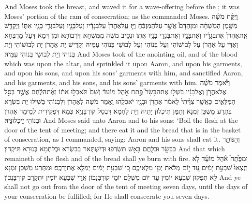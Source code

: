 {And Moses took the breast, and waved it for a wave-offering before the \lord; it was Moses’ portion of the ram of consecration; as the \lord\space commanded Moses.}{}
{וַיִּקַּ֨ח מֹשֶׁ֜ה מִשֶּׁ֣מֶן הַמִּשְׁחָ֗ה וּמִן\maqqaf הַדָּם֮ אֲשֶׁ֣ר עַל\maqqaf הַמִּזְבֵּ֒חַ֒ וַיַּ֤ז עַֽל\maqqaf אַהֲרֹן֙ עַל\maqqaf בְּגָדָ֔יו וְעַל\maqqaf בָּנָ֛יו וְעַל\maqqaf בִּגְדֵ֥י בָנָ֖יו אִתּ֑וֹ וַיְקַדֵּ֤שׁ אֶֽת\maqqaf אַהֲרֹן֙ אֶת\maqqaf בְּגָדָ֔יו וְאֶת\maqqaf בָּנָ֛יו וְאֶת\maqqaf בִּגְדֵ֥י בָנָ֖יו אִתּֽוֹ׃}
{וּנְסֵיב מֹשֶׁה מִמִּשְׁחָא דִּרְבוּתָא וּמִן דְּמָא דְּעַל מַדְבְּחָא וְאַדִּי עַל אַהֲרֹן עַל לְבוּשׁוֹהִי וְעַל בְּנוֹהִי וְעַל לְבוּשֵׁי בְּנוֹהִי עִמֵּיהּ וְקַדֵּישׁ יָת אַהֲרֹן יָת לְבוּשׁוֹהִי וְיָת בְּנוֹהי וְיָת לְבוּשֵׁי בְּנוֹהִי עִמֵּיהּ׃}
{And Moses took of the anointing oil, and of the blood which was upon the altar, and sprinkled it upon Aaron, and upon his garments, and upon his sons, and upon his sons’ garments with him, and sanctified Aaron, and his garments, and his sons, and his sons’ garments with him.}{}
{וַיֹּ֨אמֶר מֹשֶׁ֜ה אֶל\maqqaf אַהֲרֹ֣ן וְאֶל\maqqaf בָּנָ֗יו בַּשְּׁל֣וּ אֶת\maqqaf הַבָּשָׂר֮ פֶּ֣תַח אֹ֣הֶל מוֹעֵד֒ וְשָׁם֙ תֹּאכְל֣וּ אֹת֔וֹ וְאֶ֨ת\maqqaf הַלֶּ֔חֶם אֲשֶׁ֖ר בְּסַ֣ל הַמִּלֻּאִ֑ים כַּאֲשֶׁ֤ר צִוֵּ֙יתִי֙ לֵאמֹ֔ר אַהֲרֹ֥ן וּבָנָ֖יו יֹאכְלֻֽהוּ׃}
{וַאֲמַר מֹשֶׁה לְאַהֲרֹן וְלִבְנוֹהִי בַּשִּׁילוּ יָת בִּשְׂרָא בִּתְרַע מַשְׁכַּן זִמְנָא וְתַמָּן תֵּיכְלוּן יָתֵיהּ וְיָת לַחְמָא דִּבְסַל קוּרְבָּנַיָּא כְּמָא דְּפַקֵּידִית לְמֵימַר אַהֲרֹן וּבְנוֹהִי יֵיכְלוּנֵּיהּ׃}
{And Moses said unto Aaron and to his sons: ‘Boil the flesh at the door of the tent of meeting; and there eat it and the bread that is in the basket of consecration, as I commanded, saying: Aaron and his sons shall eat it.}{}
{וְהַנּוֹתָ֥ר בַּבָּשָׂ֖ר וּבַלָּ֑חֶם בָּאֵ֖שׁ תִּשְׂרֹֽפוּ׃}
{וּדְיִשְׁתְּאַר בְּבִשְׂרָא וּבְלַחְמָא בְּנוּרָא תֵּיקְדוּן׃}
{And that which remaineth of the flesh and of the bread shall ye burn with fire.}{}
{וּמִפֶּ֩תַח֩ אֹ֨הֶל מוֹעֵ֜ד לֹ֤א תֵֽצְאוּ֙ שִׁבְעַ֣ת יָמִ֔ים עַ֚ד י֣וֹם מְלֹ֔את יְמֵ֖י מִלֻּאֵיכֶ֑ם כִּ֚י שִׁבְעַ֣ת יָמִ֔ים יְמַלֵּ֖א אֶת\maqqaf יֶדְכֶֽם׃}
{וּמִתְּרַע מַשְׁכַּן זִמְנָא לָא תִפְּקוּן שִׁבְעָא יוֹמִין עַד יוֹם מִשְׁלַם יוֹמֵי קוּרְבָּנְכוֹן אֲרֵי שִׁבְעָא יוֹמִין יִתְקָרַב קוּרְבָּנְכוֹן׃}
{And ye shall not go out from the door of the tent of meeting seven days, until the days of your consecration be fulfilled; for He shall consecrate you seven days.}{}
